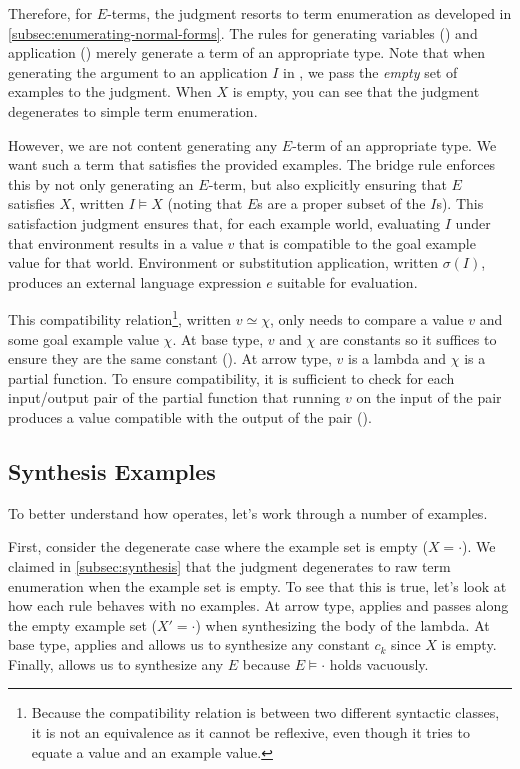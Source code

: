 Therefore, for $E$-terms, the  judgment resorts to term enumeration as developed in \autoref{subsec:enumerating-normal-forms}.
The rules for generating variables () and application () merely generate a term of an appropriate type.
Note that when generating the argument to an application $I$ in , we pass the \emph{empty} set of examples to the  judgment.
When $Χ$ is empty, you can see that the  judgment degenerates to simple term enumeration.

However, we are not content generating any $E$-term of an appropriate type.
We want such a term that satisfies the provided examples.
The bridge rule  enforces this by not only generating an $E$-term, but also explicitly ensuring that $E$ satisfies $Χ$, written $I ⊨ Χ$ (noting that $E$s are a proper subset of the $I$s).
This satisfaction judgment ensures that, for each example world, evaluating $I$ under that environment results in a value $v$ that is compatible to the goal example value for that world.
Environment or substitution application, written $σ(I)$, produces an external language expression $e$ suitable for evaluation.

This compatibility relation\footnote{%
  Because the compatibility relation is between two different syntactic classes, it is not an equivalence as it cannot be reflexive, even though it tries to equate a value and an example value.
},
written $v ≃ χ$, only needs to compare a value $v$ and some goal example value $χ$.
At base type, $v$ and $χ$ are constants so it suffices to ensure they are the same constant ().
At arrow type, $v$ is a lambda and $χ$ is a partial function.
To ensure compatibility, it is sufficient to check for each input/output pair of the partial function that running $v$ on the input of the pair produces a value compatible with the output of the pair ().

\subsection{Synthesis Examples}
\label{subsec:synthesis-examples}

To better understand how \lsyn{} operates, let's work through a number of examples.

\begin{example}
  First, consider the degenerate case where the example set is empty ($Χ = ·$).
  We claimed in \autoref{subsec:synthesis} that the  judgment degenerates to raw term enumeration when the example set is empty.
  To see that this is true, let's look at how each  rule behaves with no examples.
  At arrow type,  applies and passes along the empty example set ($Χ' = ·$) when synthesizing the body of the lambda.
  At base type,  applies and allows us to synthesize any constant $c_k$ since $Χ$ is empty.
  Finally,  allows us to synthesize any $E$ because $E ⊨ ·$ holds vacuously.
\end{example}

